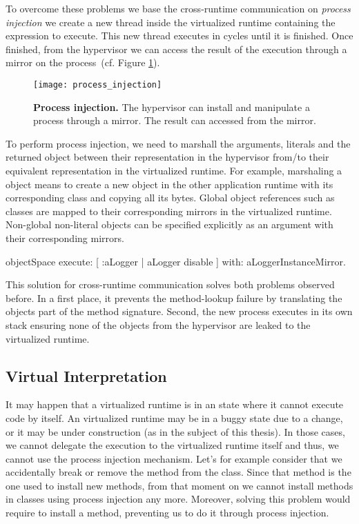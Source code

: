 To overcome these problems we base the cross-runtime communication on \emph{process injection} \ie we create a new thread inside the virtualized runtime containing the expression to execute. This new thread executes in cycles until it is finished. Once finished, from the hypervisor we can access the result of the execution through a mirror on the process~(cf. Figure \ref{fig:process_injection}).

\begin{figure}[ht]
\center
\texttt{[image: process\_injection]}
\caption{\textbf{Process injection.} The hypervisor can install and manipulate a process through a mirror. The result can accessed from the mirror.\label{fig:process_injection}}
\end{figure}

To perform process injection, we need to marshall the arguments, literals and the returned object between their representation in the hypervisor from/to their equivalent representation in the virtualized runtime. For example, marshaling a  object means to create a new  object in the other application runtime with its corresponding class and copying all its bytes. Global object references such as classes are mapped to their corresponding mirrors in the virtualized runtime. Non-global non-literal objects can be specified explicitly as an argument with their corresponding mirrors.

\begin{code}
objectSpace
	execute: [ :aLogger | aLogger disable ]
	with: aLoggerInstanceMirror.
\end{code}

This solution for cross-runtime communication solves both problems observed before. In a first place, it prevents the method-lookup failure by translating the objects part of the method signature. Second, the new process executes in its own stack ensuring none of the objects from the hypervisor are leaked to the virtualized runtime.

\subsection{Virtual Interpretation} \label{sec:interpretation}

It may happen that a virtualized runtime is in an state where it cannot execute code by itself. An virtualized runtime may be in a buggy state due to a change, or it may be under construction (as in the subject of this thesis). In those cases, we cannot delegate the execution to the virtualized runtime itself and thus, we cannot use the process injection mechanism. Let's for example consider that we accidentally break or remove the  method from the  class. Since that method is the one used to install new methods, from that moment on we cannot install methods in classes using process injection any more. Moreover, solving this problem would require to install a method, preventing us to do it through process injection.

